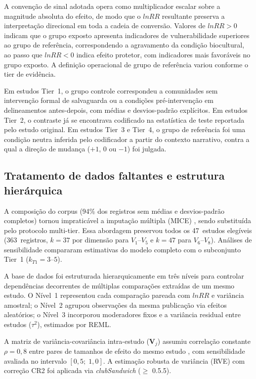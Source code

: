\documentclass[12pt,a4paper]{article}
\begin{document}
A convenção de sinal adotada opera como multiplicador escalar sobre a magnitude absoluta do efeito, de modo que o $lnRR$ resultante preserva a interpretação direcional em toda a cadeia de conversão. Valores de $lnRR > 0$ indicam que o grupo exposto apresenta indicadores de vulnerabilidade superiores ao grupo de referência, correspondendo a agravamento da condição biocultural, ao passo que $lnRR < 0$ indica efeito protetor, com indicadores mais favoráveis no grupo exposto. A definição operacional de grupo de referência variou conforme o tier de evidência. 

Em estudos Tier~1, o grupo controle correspondeu a comunidades sem intervenção formal de salvaguarda ou a condições pré-intervenção em delineamentos antes-depois, com médias e desvios-padrão explícitos. Em estudos Tier~2, o contraste já se encontrava codificado na estatística de teste reportada pelo estudo original. Em estudos Tier~3 e Tier~4, o grupo de referência foi uma condição neutra inferida pelo codificador a partir do contexto narrativo, contra a qual a direção de mudança ($+1$, $0$ ou $-1$) foi julgada.

\subsection{Tratamento de dados faltantes e estrutura hierárquica}
\label{sec:missing}

A composição do corpus (94\% dos registros sem médias e desvios-padrão completos) tornou impraticável a imputação múltipla (MICE) \citep{vanBuuren2011}, sendo substituída pelo protocolo multi-tier. Essa abordagem preservou todos os 47~estudos elegíveis (363~registros, $k = 37$ por dimensão para $V_1$--$V_5$ e $k = 47$ para $V_6$--$V_8$). Análises de sensibilidade compararam estimativas do modelo completo com o subconjunto Tier~1 ($k_{T1} = 3\text{--}5$).

A base de dados foi estruturada hierarquicamente em três níveis \citep{Pustejovsky2022} para controlar dependências decorrentes de múltiplas comparações extraídas de um mesmo estudo. O Nível~1 representou cada comparação pareada com $lnRR$ e variância amostral; o Nível~2 agrupou observações da mesma publicação via efeitos aleatórios; o Nível~3 incorporou moderadores fixos e a variância residual entre estudos ($\tau^2$), estimados por REML. 

A matriz de variância-covariância intra-estudo ($\mathbf{V}_j$) assumiu correlação constante $\rho = 0{,}8$ entre pares de tamanhos de efeito do mesmo estudo \citep{Pustejovsky2022}, com sensibilidade avaliada no intervalo $[0{,}5;\; 1{,}0]$. A estimação robusta de variância (RVE) com correção CR2 foi aplicada via \textit{clubSandwich} ($\geq$ 0.5.5).
\end{document}
